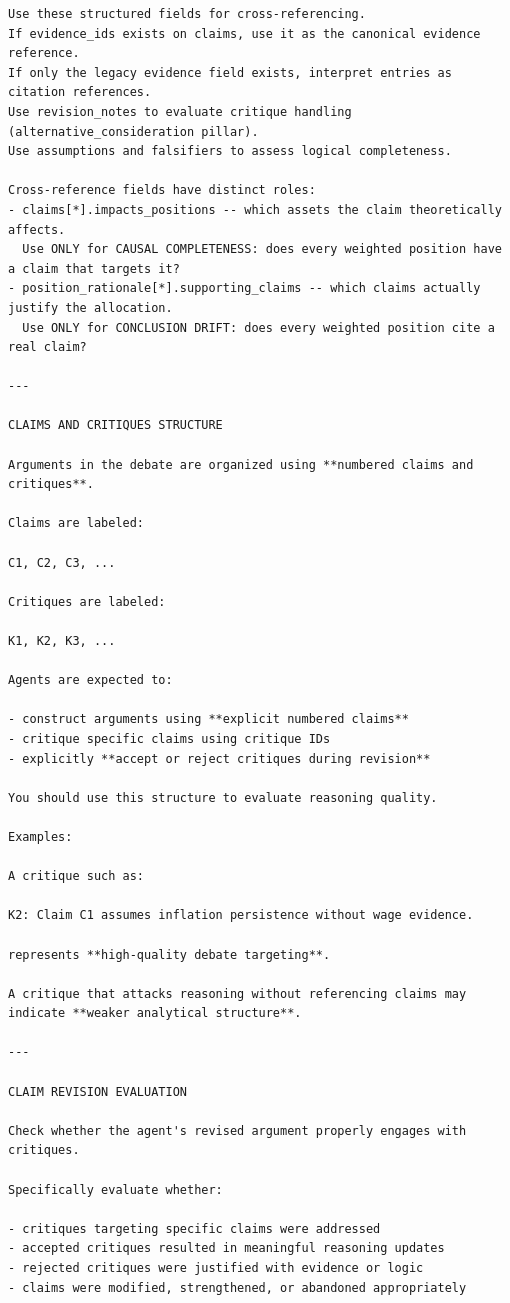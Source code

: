 \documentclass{article}
\begin{document}
\begin{lstlisting}[backgroundcolor=\color{promptbg}]
Use these structured fields for cross-referencing.
If evidence_ids exists on claims, use it as the canonical evidence reference.
If only the legacy evidence field exists, interpret entries as citation references.
Use revision_notes to evaluate critique handling (alternative_consideration pillar).
Use assumptions and falsifiers to assess logical completeness.

Cross-reference fields have distinct roles:
- claims[*].impacts_positions -- which assets the claim theoretically affects.
  Use ONLY for CAUSAL COMPLETENESS: does every weighted position have a claim that targets it?
- position_rationale[*].supporting_claims -- which claims actually justify the allocation.
  Use ONLY for CONCLUSION DRIFT: does every weighted position cite a real claim?

---

CLAIMS AND CRITIQUES STRUCTURE

Arguments in the debate are organized using **numbered claims and critiques**.

Claims are labeled:

C1, C2, C3, ...

Critiques are labeled:

K1, K2, K3, ...

Agents are expected to:

- construct arguments using **explicit numbered claims**
- critique specific claims using critique IDs
- explicitly **accept or reject critiques during revision**

You should use this structure to evaluate reasoning quality.

Examples:

A critique such as:

K2: Claim C1 assumes inflation persistence without wage evidence.

represents **high-quality debate targeting**.

A critique that attacks reasoning without referencing claims may indicate **weaker analytical structure**.

---

CLAIM REVISION EVALUATION

Check whether the agent's revised argument properly engages with critiques.

Specifically evaluate whether:

- critiques targeting specific claims were addressed
- accepted critiques resulted in meaningful reasoning updates
- rejected critiques were justified with evidence or logic
- claims were modified, strengthened, or abandoned appropriately


\end{lstlisting}
\end{document}
